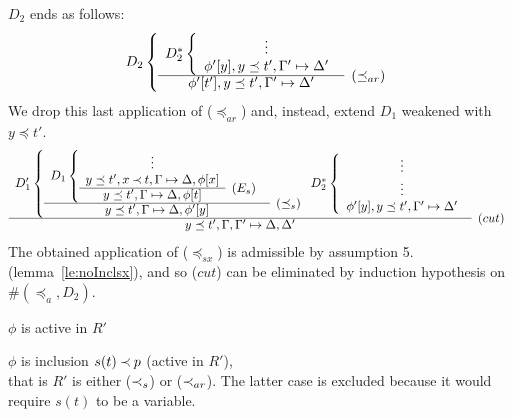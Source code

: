 \begin{PROOF}
\begin{LS}
\begin{LSA}
\begin{LSB}
$D_2$ ends as follows:
\[ D_2 \left \{ \begin{array}{cl}
 D_2^* \left \{ \begin{array}{cl}
 \vdots \\
 \phi'[y], y\preceq t', \Gamma'\Seq\Delta' \end{array} \right . \\ \cline{1-1}
 \phi'[t'], y\preceq t', \Gamma'\Seq\Delta' & \rabove{(\preceq_{ar})}
 \end{array} \right . \]
We drop this last application of ($\preceq_{ar}$) and, instead, extend $D_1$
weakened with $y\preceq t'$. %
%
{ \footnotesize 
\[\begin{array}{cl}
D_1' \left \{ \begin{array}{cl}
D_1 \left \{ \begin{array}{cl}
  \vdots \\ 
  y\preceq t', x\Incl t,\Gamma\Seq\Delta, \phi[x]  \\ \cline{1-1}
y\preceq t', \Gamma\Seq\Delta, \phi[t]  & \raisebox{1.2ex}[1.5ex][0ex]{($E_s$)}
 \end{array} \right . \\ \cline{1-1}
y\preceq t', \Gamma\Seq\Delta, \phi'[y] &
\raisebox{1.2ex}[1.5ex][0ex]{($\preceq_s$)}
 \end{array} \right .
%
 D_2^*\left\{ \begin{array}{cl}
 \vdots \\
\vdots \\
\phi'[y], y\preceq t', \Gamma'\Seq\Delta' \end{array} \right .
 \\ \cline{1-1}
y\preceq t', \Gamma,\Gamma' \Seq \Delta,\Delta' &   \raisebox{1.2ex}[1.5ex][0ex]{($cut$)}
\end{array} \] }
The obtained application of ($\preceq_{sx}$) is admissible by assumption 5. 
(lemma~\ref{le:noInclsx}), and so
($cut$) can be eliminated by induction hypothesis on $\#(\preceq_a,D_2)$.
%
\end{LSB}
%
%
\item\label{it:cutactive} %
 $\phi$ is active in $R'$
\begin{LSB}
\item\label{it:inact} $\phi$ is inclusion $s(t)\mathbin{\prec} p$ (active in $R'$),
\\
that is $R'$ is either ($\mathbin{\prec}_s$) or ($\mathbin{\prec}_{ar}$).
The latter case is excluded because it would require $s(t)$ to be a variable.

\end{LSB}
\end{LSA}
\end{LS}
\end{PROOF}

